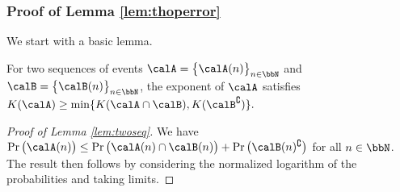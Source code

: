 \documentclass[11pt,onecolumn]{article}
\begin{document}
\subsubsection{Proof of Lemma \ref{lem:thoperror}}
We start with a basic lemma. 
\begin{lemma}\label{lem:twoseq}
    For two sequences of events $\calA=\big\{\calA(n)\big\}_{n\in\bbN}$ and $\calB=\big\{\calB(n)\big\}_{n\in\bbN}$, the exponent of $\calA$ satisfies
    $
        K ( \calA)\geq \min\{K ( \calA\cap \calB),K (\calB^{\complement})\}.
    $
\end{lemma}
\begin{proof}[Proof of Lemma \ref{lem:twoseq}]
    We have
    $
	    \Pr\big(\calA(n)\big)\le \Pr\big( \calA(n)\cap \calB(n)\big)+\Pr\big(\calB(n)^{\complement}\big)
	$  for all $n\in\bbN$. The result then follows by considering  the normalized logarithm of the probabilities and taking limits. 
\end{proof}
\end{document}
